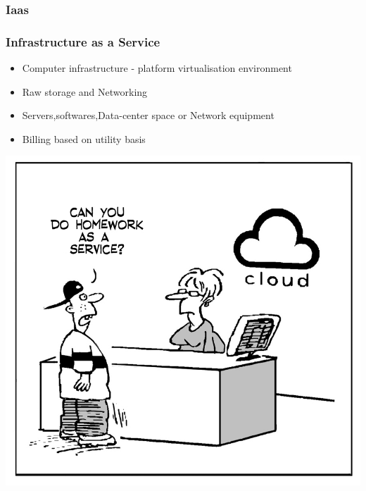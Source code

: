 \documentclass [12pt] {beamer}
\begin{document}
\subsubsection{Iaas}
\begin{frame}
\frametitle{Infrastructure as a Service}
\begin{itemize} [<+->]
 \item Computer infrastructure - platform virtualisation environment
 \item Raw storage and Networking
 \item Servers,softwares,Data-center space or Network equipment
 \item Billing based on utility basis
\end{itemize}
\end{frame}

\begin{frame}
\begin{center}
\includegraphics[scale=1.1,keepaspectratio=true]{2.jpg} 
\end{center}
\end{frame}
\end{document}

